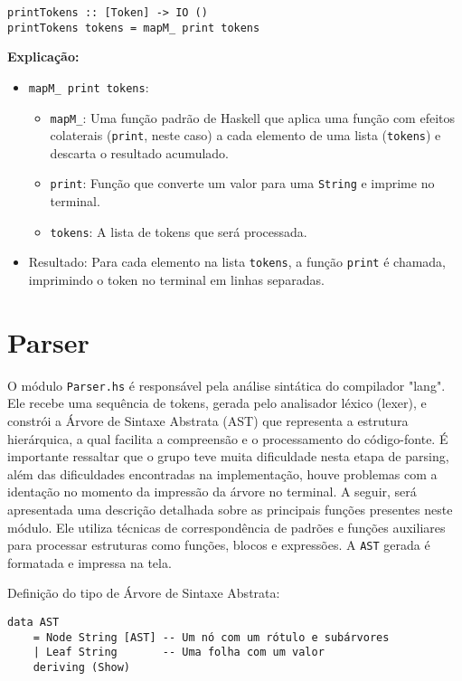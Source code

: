 \documentclass{article}
\begin{document}
\begin{verbatim}
printTokens :: [Token] -> IO ()
printTokens tokens = mapM_ print tokens
\end{verbatim}

\textbf{Explicação:}
\begin{itemize}
    \item \texttt{mapM\_ print tokens}: 
    \begin{itemize}
        \item \texttt{mapM\_}: Uma função padrão de Haskell que aplica uma função com efeitos colaterais (\texttt{print}, neste caso) a cada elemento de uma lista (\texttt{tokens}) e descarta o resultado acumulado. 
        \item \texttt{print}: Função que converte um valor para uma \texttt{String} e imprime no terminal.
        \item \texttt{tokens}: A lista de tokens que será processada.
    \end{itemize}

    \item Resultado:
    Para cada elemento na lista \texttt{tokens}, a função \texttt{print} é chamada, imprimindo o token no terminal em linhas separadas.
\end{itemize}

\newpage
\section{Parser}
O módulo \texttt{Parser.hs} é responsável pela análise sintática do compilador "lang". Ele recebe uma sequência de tokens, gerada pelo analisador léxico (lexer), e constrói a Árvore de Sintaxe Abstrata (AST) que representa a estrutura hierárquica, a qual facilita a compreensão e o processamento do código-fonte. É importante ressaltar que o grupo teve muita dificuldade nesta etapa de parsing, além das dificuldades encontradas na implementação, houve problemas com a identação no momento da impressão da árvore no terminal.
A seguir, será apresentada uma descrição detalhada sobre as principais funções presentes neste módulo. Ele utiliza técnicas de correspondência de padrões e funções auxiliares para processar estruturas como funções, blocos e expressões. A \texttt{AST} gerada é formatada e impressa na tela.

Definição do tipo de Árvore de Sintaxe Abstrata:

\begin{verbatim}
data AST
    = Node String [AST] -- Um nó com um rótulo e subárvores
    | Leaf String       -- Uma folha com um valor
    deriving (Show)
\end{verbatim} 
\end{document}
